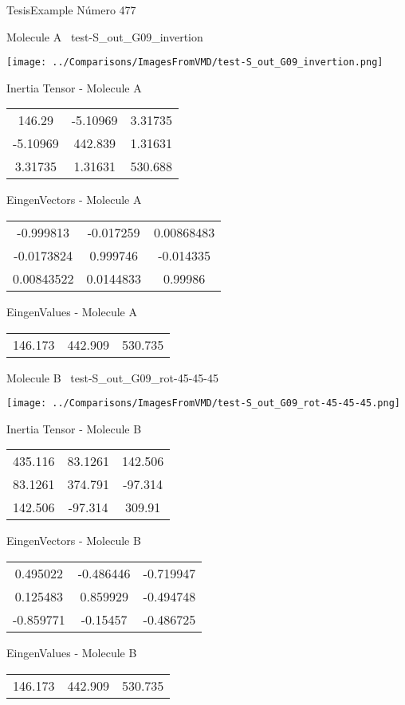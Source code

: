 \vtab[-3cm]
\begin{center}
{\large TesisExample \tab Número 477}
\end{center}
\begin{multicols}{2}
\begin{center}

Molecule A \
test-S\_out\_G09\_invertion

\texttt{[image: ../Comparisons/ImagesFromVMD/test-S\_out\_G09\_invertion.png]}

Inertia Tensor - Molecule A \\
\begin{tabular}{|c c c|}
146.29	 & 	-5.10969	 & 	3.31735	 \\
-5.10969	 & 	442.839	 & 	1.31631	 \\
3.31735	 & 	1.31631	 & 	530.688
\end{tabular}

\vtab
 EingenVectors - Molecule A     \\
\begin{tabular}{|c c c|}
-0.999813	 & 	-0.017259	 & 	0.00868483	 \\
-0.0173824	 & 	0.999746	 & 	-0.014335	 \\
0.00843522	 & 	0.0144833	 & 	0.99986
\end{tabular}

\vtab
 EingenValues - Molecule A     \\
\begin{tabular}{|c c c|}
146.173	 & 	442.909	 & 	530.735	 \\
\end{tabular}
\columnbreak

Molecule B \
test-S\_out\_G09\_rot-45-45-45

\texttt{[image: ../Comparisons/ImagesFromVMD/test-S\_out\_G09\_rot-45-45-45.png]}

Inertia Tensor - Molecule B \\
\begin{tabular}{|c c c|}
435.116	 & 	83.1261	 & 	142.506	 \\
83.1261	 & 	374.791	 & 	-97.314	 \\
142.506	 & 	-97.314	 & 	309.91
\end{tabular}

\vtab
 EingenVectors - Molecule B     \\
\begin{tabular}{|c c c|}
0.495022	 & 	-0.486446	 & 	-0.719947	 \\
0.125483	 & 	0.859929	 & 	-0.494748	 \\
-0.859771	 & 	-0.15457	 & 	-0.486725
\end{tabular}

\vtab
 EingenValues - Molecule B     \\
\begin{tabular}{|c c c|}
146.173	 & 	442.909	 & 	530.735	 \\
\end{tabular}

\end{center}
\end{multicols}

